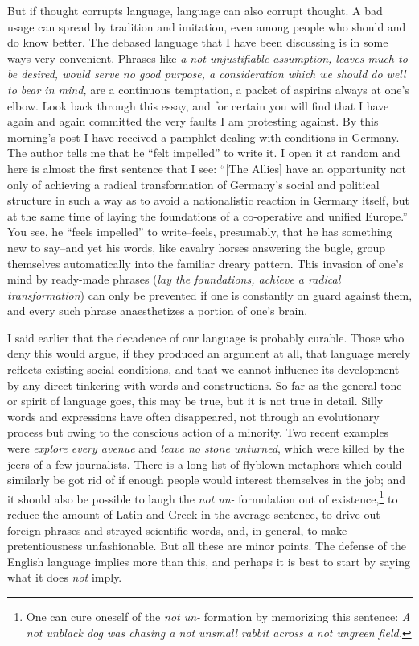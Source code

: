 \documentclass[a4paper]{article}
\begin{document}
But if thought corrupts language, language can also corrupt thought. A bad usage can spread by tradition and imitation, even among people who should and do know better. The debased language that I have been discussing is in some ways very convenient. Phrases like \textit{a not unjustifiable assumption, leaves much to be desired, would serve no good purpose, a consideration which we should do well to bear in mind,} are a continuous temptation, a packet of aspirins always at one's elbow. Look back through this essay, and for certain you will find that I have again and again committed the very faults I am protesting against. By this morning's post I have received a pamphlet dealing with conditions in Germany. The author tells me that he ``felt impelled'' to write it. I open it at random and here is almost the first sentence that I see: ``[The Allies] have an opportunity not only of achieving a radical transformation of Germany's social and political structure in such a way as to avoid a nationalistic reaction in Germany itself, but at the same time of laying the foundations of a co-operative and unified Europe.'' You see, he ``feels impelled'' to write--feels, presumably, that he has something new to say--and yet his words, like cavalry horses answering the bugle, group themselves automatically into the familiar dreary pattern. This invasion of one's mind by ready-made phrases (\textit{lay the foundations, achieve a radical transformation}) can only be prevented if one is constantly on guard against them, and every such phrase anaesthetizes a portion of one's brain.

I said earlier that the decadence of our language is probably curable. Those who deny this would argue, if they produced an argument at all, that language merely reflects existing social conditions, and that we cannot influence its development by any direct tinkering with words and constructions. So far as the general tone or spirit of language goes, this may be true, but it is not true in detail. Silly words and expressions have often disappeared, not through an evolutionary process but owing to the conscious action of a minority. Two recent examples were \textit{explore every avenue} and \textit{leave no stone unturned}, which were killed by the jeers of a few journalists. There is a long list of flyblown metaphors which could similarly be got rid of if enough people would interest themselves in the job; and it should also be possible to laugh the \textit{not un-} formulation out of existence,\footnote{One can cure oneself of the \textit{not un-} formation by memorizing this sentence: \textit{A not unblack dog was chasing a not unsmall rabbit across a not ungreen field.}} to reduce the amount of Latin and Greek in the average sentence, to drive out foreign phrases and strayed scientific words, and, in general, to make pretentiousness unfashionable. But all these are minor points. The defense of the English language implies more than this, and perhaps it is best to start by saying what it does \textit{not} imply.
\end{document}
